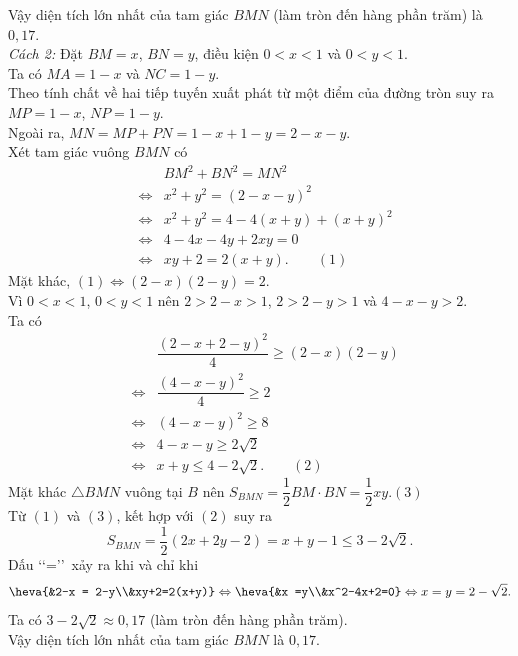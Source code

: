 \begin{ex}
{		Vậy diện tích lớn nhất của tam giác $BMN$ (làm tròn đến hàng phần trăm) là $0{,}17$.\\
		{\it Cách 2:}
		Đặt $BM=x$, $BN=y$, điều kiện $0<x<1$ và $0<y<1$.\\
		Ta có $MA=1-x$ và $NC=1-y$. \\
		Theo tính chất về hai tiếp tuyến xuất phát từ một điểm của đường tròn suy ra $MP=1-x$, $NP=1-y$.\\
		Ngoài ra, $MN=MP+PN=1-x+1-y=2-x-y$.\\
		Xét tam giác vuông $BMN$ có
		\begin{eqnarray*}
			&&BM^2+BN^2=MN^2\\
			&\Leftrightarrow& x^2+y^2=(2-x-y)^2\\
			&\Leftrightarrow&x^2+y^2 = 4-4(x+y)+(x+y)^2\\
			&\Leftrightarrow& 4-4x-4y+2xy=0\\
			&\Leftrightarrow& xy+2=2(x+y).\qquad (1)
		\end{eqnarray*}
		Mặt khác, $(1)\Leftrightarrow(2-x)(2-y) = 2$.\\
		Vì $0<x<1$, $0<y<1$ nên $2>2-x>1$, $2>2-y>1$ và $4-x-y>2$. \\
		Ta có
		\begin{eqnarray*}
			&&\dfrac{(2-x+2-y)^2}{4}\geq (2-x)(2-y)\\
			&\Leftrightarrow &\dfrac{(4-x-y)^2}{4}\geq 2\\
			&\Leftrightarrow &(4-x-y)^2\geq 8\\
			&\Leftrightarrow &4-x-y\geq 2\sqrt{2}\\
			&\Leftrightarrow &x+y\leq 4-2\sqrt{2}.\qquad (2)
		\end{eqnarray*}
		Mặt khác $\triangle BMN$ vuông tại $B$ nên $S_{BMN}=\dfrac{1}{2} BM\cdot BN=\dfrac{1}{2}xy$.\hfill $(3)$\\
		Từ $(1)$ và $(3)$, kết hợp với $(2)$ suy ra
		\[S_{BMN}=\dfrac{1}{2}(2x+2y-2)=x+y-1\leq3-2\sqrt{2}.
		\]
		Dấu \lq\lq=\rq\rq\ xảy ra khi và chỉ khi
		\[\heva{&2-x = 2-y\\&xy+2=2(x+y)}\Leftrightarrow\heva{&x =y\\&x^2-4x+2=0}\Leftrightarrow x =y=2-\sqrt{2}.
		\]
		Ta có $3-2\sqrt{2}\approx 0{,}17$ (làm tròn đến hàng phần trăm).\\
		Vậy diện tích lớn nhất của tam giác $BMN$ là $0{,}17$.\\
	}
\end{ex}

